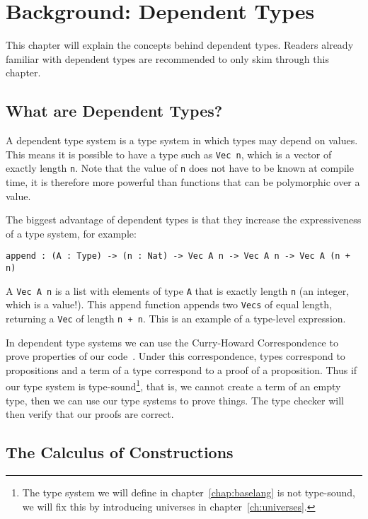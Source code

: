 \chapter{\label{chap:bg-dp}Background: Dependent Types}

This chapter will explain the concepts behind dependent types. Readers already familiar with dependent types are recommended to only skim through this chapter.

\section{What are Dependent Types?}

A dependent type system is a type system in which types may depend on values. This means it is possible to have a type such as \verb|Vec n|, which is a vector of exactly length \verb|n|. Note that the value of \verb|n| does not have to be known at compile time, it is therefore more powerful than functions that can be polymorphic over a value.

The biggest advantage of dependent types is that they increase the expressiveness of a type system, for example:
\begin{lstlisting}
append : (A : Type) -> (n : Nat) -> Vec A n -> Vec A n -> Vec A (n + n)
\end{lstlisting}
A \verb|Vec A n| is a list with elements of type \verb|A| that is exactly length \verb|n| (an integer, which is a value!). This append function appends two \verb|Vecs| of equal length, returning a \verb|Vec| of length \verb|n + n|. This is an example of a type-level expression.

In dependent type systems we can use the Curry-Howard Correspondence to prove properties of our code~\cite{chc}. Under this correspondence, types correspond to propositions and a term of a type correspond to a proof of a proposition. Thus if our type system is type-sound\footnote{The type system we will define in chapter~\ref{chap:baselang} is not type-sound, we will fix this by introducing universes in chapter~\ref{ch:universes}.}, that is, we cannot create a term of an empty type, then we can use our type systems to prove things. The type checker will then verify that our proofs are correct.

\section{The Calculus of Constructions}

